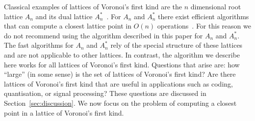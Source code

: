 \documentclass[final,leqno]{siamltex}
\begin{document}





Classical examples of lattices of Voronoi's first kind are the $n$ dimensional root lattice $A_n$ and its dual lattice $A_n^*$~\cite{SPLAG}.  %
For $A_n$ and $A_n^*$ there exist efficient algorithms that can compute a closest lattice point in $O(n)$ operations~\cite{McKilliam2009CoxeterLattices,Conway1982FastQuantDec}. For this reason we do not recommend using the algorithm described in this paper for $A_n$ and $A_n^*$.  
The fast algorithms for $A_n$ and $A_n^*$ rely of the special structure of these lattices and are not applicable to other lattices.  In contrast, the algorithm we describe here works for all lattices of Voronoi's first kind.  Questions that arise are: how ``large'' (in some sense) is the set of lattices of Voronoi's first kind?  Are there lattices of Voronoi's first kind that are useful in applications such as coding, quantisation, or signal processing?  These questions are discussed in Section~\ref{sec:discussion}.  We now focus on the problem of computing a closest point in a lattice of Voronoi's first kind. 
\end{document}
